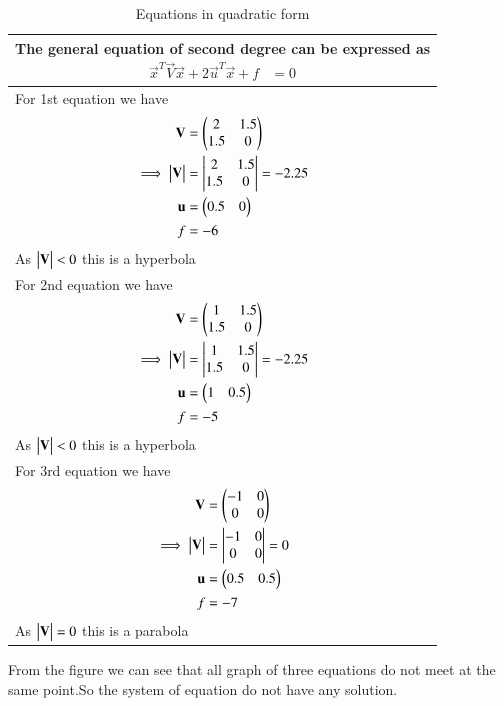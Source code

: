 \documentclass[journal,12pt,twocolumn]{IEEEtran}
\begin{document}
\begin{table}[h!]
\begin{center}
\begin{tabular}{|m{9cm}|}\hline
        The general equation of second degree can be expressed as
        {\begin{align*}
            \vec{x}^T\vec{V}\vec{x}+2\vec{u}^T\vec{x}+f &= 0
        \end{align*}}\\
        \hline
        For 1st equation we have{\begin{align*}
            \mathbf{V} &= \begin{pmatrix}2&1.5\\1.5&0\end{pmatrix}\\
            \implies\begin{vmatrix}\mathbf{V}\end{vmatrix} &= \begin{vmatrix}2&1.5\\1.5&0\end{vmatrix}=-2.25\\
            \mathbf{u} &= \begin{pmatrix}0.5&0\end{pmatrix}\\
            f &= -6
        \end{align*}}
        As $\begin{vmatrix}\mathbf{V}\end{vmatrix}<0$ this is a hyperbola\\
        \hline
        For 2nd equation we have{\begin{align*}
            \mathbf{V} &= \begin{pmatrix}1&1.5\\1.5&0\end{pmatrix}\\
            \implies\begin{vmatrix}\mathbf{V}\end{vmatrix} &= \begin{vmatrix}1&1.5\\1.5&0\end{vmatrix}=-2.25\\
            \mathbf{u} &= \begin{pmatrix}1&0.5\end{pmatrix}\\
            f &= -5
        \end{align*}}
        As $\begin{vmatrix}\mathbf{V}\end{vmatrix}<0$ this is a hyperbola\\
        \hline
        For 3rd equation we have{\begin{align*}
            \mathbf{V} &= \begin{pmatrix}-1&0\\0&0\end{pmatrix}\\
            \implies\begin{vmatrix}\mathbf{V}\end{vmatrix} &= \begin{vmatrix}-1&0\\0&0\end{vmatrix} = 0\\
            \mathbf{u} &= \begin{pmatrix}0.5&0.5\end{pmatrix}\\
            f &= -7
        \end{align*}}
        As $\begin{vmatrix}\mathbf{V}\end{vmatrix}=0$ this is a parabola\\
        \hline
\end{tabular}
\end{center}
\caption{Equations in quadratic form}
\label{tab:my_label}
\end{table}
From the figure we can see that all graph of three equations do not meet at the same point.So the system of equation do not have any solution. 
\end{document}

